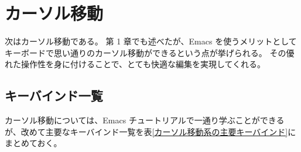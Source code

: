 \section{カーソル移動}
次はカーソル移動である。
第 1 章でも述べたが、Emacs を使うメリットとしてキーボードで思い通りのカーソル移動ができるという点が挙げられる。
その優れた操作性を身に付けることで、とても快適な編集を実現してくれる。
\subsection{キーバインド一覧}
カーソル移動については、Emacs チュートリアルで一通り学ぶことができるが、改めて主要なキーバインド一覧を表\ref{カーソル移動系の主要キーバインド}にまとめておく。
